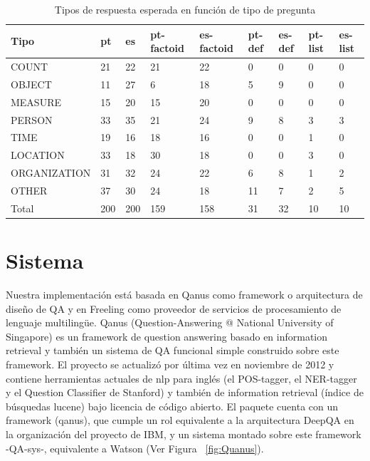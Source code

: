 \begin{center}
\begin{table}
\centering
\begin{tabular}{| l | l | l | l | l | l |l |l|l|}
\hline
Tipo & pt & es & pt-factoid & es-factoid & pt-def & es-def & pt-list & es-list \\ \hline
COUNT & 21 & 22 & 21 & 22 & 0 & 0 & 0  & 0\\ \hline
OBJECT & 11 & 27 & 6  & 18 & 5 & 9 & 0  & 0\\ \hline
MEASURE & 15 & 20 & 15 & 20 & 0 & 0 & 0  & 0\\ \hline
PERSON & 33  & 35 & 21 & 24 & 9 & 8 & 3 & 3\\ \hline
TIME & 19 & 16 & 18 & 16 & 0 & 0 & 1 & 0\\ \hline
LOCATION & 33 & 18  & 30 & 18 & 0 & 0 & 3 & 0 \\ \hline
ORGANIZATION & 31 & 32 & 24 & 22 & 6 & 8 & 1 & 2\\ \hline
OTHER & 37 & 30 & 24 & 18 & 11 & 7 & 2 & 5 \\ \hline
Total & 200 & 200 & 159 & 158 & 31 & 32  & 10 & 10\\ \hline
\end{tabular}
\caption{Tipos de respuesta esperada en función de tipo de pregunta}
\label{table:tipo-general}
\end{table}
\end{center}


\section{Sistema}
\label{sec:sistema}

Nuestra implementación está basada en Qanus como framework o arquitectura de diseño de QA y en Freeling como proveedor de servicios de procesamiento de lenguaje multilingüe. Qanus (Question-Answering @ National University of Singapore) es un framework de question answering basado en information retrieval y también un sistema de QA funcional simple construido sobre este framework. El proyecto se actualizó por última vez en noviembre de 2012 y contiene herramientas actuales de nlp para inglés (el POS-tagger, el NER-tagger y el Question Classifier de Stanford) y también de information retrieval (índice de búsquedas lucene) bajo licencia de código abierto. El paquete cuenta con un framework (qanus), que cumple un rol equivalente a la arquitectura DeepQA en la organización del proyecto de IBM, y un sistema montado sobre este framework -QA-sys-, equivalente a Watson (Ver Figura ~\ref{fig:Quanus}).


